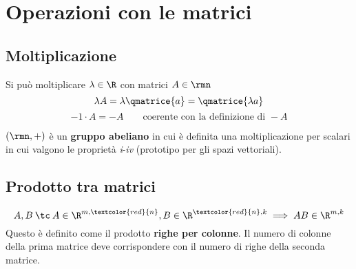 
\section{Operazioni con le matrici}
\subsection{Moltiplicazione}

Si può moltiplicare $\lambda \in \R$ con matrici $A\in\rmn$
\[
\lambda A=\lambda\qmatrice{a}=\qmatrice{\lambda a}
\]
\[
-1\cdot A = -A\qquad\text{coerente con la definizione di }-A
\]

\esempio{
\[
2\begin{pmatrix}
3 & 1 & 0\\
-1 & 4 & 1
\end{pmatrix}=\begin{pmatrix}
6 & 2 & 0\\
-2 & 8 & 2
\end{pmatrix}
\]
}



$(\rmn, +)$ è un \textbf{gruppo abeliano} in cui è definita una moltiplicazione per scalari in cui valgono le proprietà \textit{i}-\textit{iv} (prototipo per gli spazi vettoriali).

\subsection{Prodotto tra matrici}
\[
A,B\:\tc\: A\in\R^{m,\textcolor{red}{n}}, B\in\R^{\textcolor{red}{n}, k}\implies AB\in \R^{m, k}
\]
Questo è definito come il prodotto \textbf{righe per colonne}. Il numero di colonne della prima matrice deve corrispondere con il numero di righe della seconda matrice.


